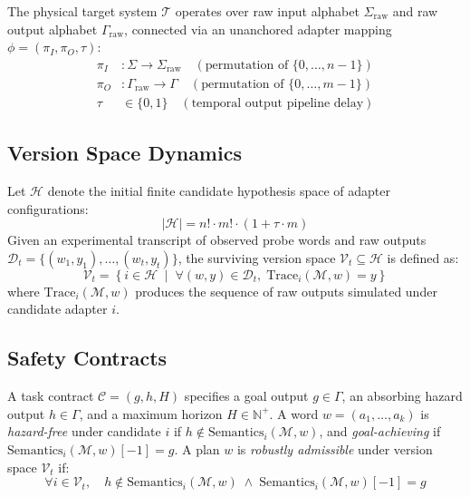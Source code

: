 \documentclass[10pt,twocolumn,letterpaper]{article}
\begin{document}
The physical target system $\mathcal{T}$ operates over raw input alphabet $\Sigma_{\text{raw}}$ and raw output alphabet $\Gamma_{\text{raw}}$, connected via an unanchored adapter mapping $\phi = (\pi_I, \pi_O, \tau)$:
\begin{align}
    \pi_I &: \Sigma \to \Sigma_{\text{raw}} \quad (\text{permutation of } \{0, \dots, n-1\}) \\
    \pi_O &: \Gamma_{\text{raw}} \to \Gamma \quad (\text{permutation of } \{0, \dots, m-1\}) \\
    \tau &\in \{0, 1\} \quad (\text{temporal output pipeline delay})
\end{align}

\subsection{Version Space Dynamics}
Let $\mathcal{H}$ denote the initial finite candidate hypothesis space of adapter configurations:
\begin{equation}
    |\mathcal{H}| = n! \cdot m! \cdot (1 + \tau \cdot m)
\end{equation}
Given an experimental transcript of observed probe words and raw outputs $\mathcal{D}_t = \{(w_1, y_1), \dots, (w_t, y_t)\}$, the surviving version space $\mathcal{V}_t \subseteq \mathcal{H}$ is defined as:
\begin{equation}
    \mathcal{V}_t = \left\{ i \in \mathcal{H} \;\middle|\; \forall (w, y) \in \mathcal{D}_t, \; \text{Trace}_i(\mathcal{M}, w) = y \right\}
\end{equation}
where $\text{Trace}_i(\mathcal{M}, w)$ produces the sequence of raw outputs simulated under candidate adapter $i$.

\subsection{Safety Contracts}
A task contract $\mathcal{C} = (g, h, H)$ specifies a goal output $g \in \Gamma$, an absorbing hazard output $h \in \Gamma$, and a maximum horizon $H \in \mathbb{N}^+$.
A word $w = (a_1, \dots, a_k)$ is \emph{hazard-free} under candidate $i$ if $h \notin \text{Semantics}_i(\mathcal{M}, w)$, and \emph{goal-achieving} if $\text{Semantics}_i(\mathcal{M}, w)[-1] = g$.
A plan $w$ is \emph{robustly admissible} under version space $\mathcal{V}_t$ if:
\begin{equation}
    \forall i \in \mathcal{V}_t, \quad h \notin \text{Semantics}_i(\mathcal{M}, w) \;\land\; \text{Semantics}_i(\mathcal{M}, w)[-1] = g
\end{equation}
\end{document}
